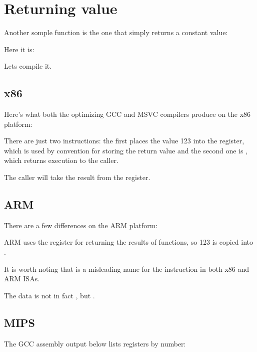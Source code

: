 \section{Returning value}

Another somple function is the one that simply returns a constant value:

Here it is:



Lets compile it.

\subsection{x86}

Here's what both the optimizing GCC and MSVC compilers produce on the x86 platform:



There are just two instructions: the first places the value 123 into the \EAX register, 
which is used by convention for storing the return
value and the second one is \RET, which returns execution to the \gls{caller}.

The caller will take the result from the \EAX register.

\subsection{ARM}

There are a few differences on the ARM platform:



ARM uses the register  for returning the results of functions, so 123 is copied into .

It is worth noting that \MOV is a misleading name for the instruction in both x86 and ARM \ac{ISA}s.

The data is not in fact , but .

\subsection{MIPS}

\label{MIPS_leaf_function_ex1}

The GCC assembly output below lists registers by number:


